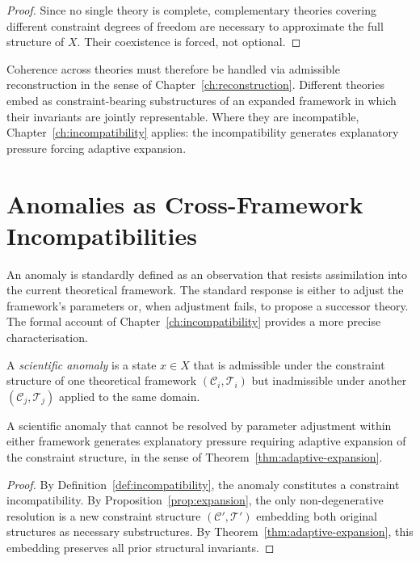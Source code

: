 \documentclass[11pt,openany]{book}
\begin{document}
\begin{proof}
Since no single theory is complete, complementary theories
covering different constraint degrees of freedom are
necessary to approximate the full structure of $X$.
Their coexistence is forced, not optional.
\end{proof}

Coherence across theories must therefore be handled via
admissible reconstruction in the sense of
Chapter~\ref{ch:reconstruction}.  Different theories embed
as constraint-bearing substructures of an expanded
framework in which their invariants are jointly
representable.  Where they are incompatible,
Chapter~\ref{ch:incompatibility} applies: the
incompatibility generates explanatory pressure forcing
adaptive expansion.

\section{Anomalies as Cross-Framework Incompatibilities}
\label{sec:anomalies}

An anomaly is standardly defined as an observation that
resists assimilation into the current theoretical
framework.  The standard response is either to adjust the
framework's parameters or, when adjustment fails, to
propose a successor theory.  The formal account of
Chapter~\ref{ch:incompatibility} provides a more precise
characterisation.

\begin{definition}
\label{def:anomaly}
A \emph{scientific anomaly} is a state $x \in X$ that is
admissible under the constraint structure of one
theoretical framework $(\mathcal{C}_i, \mathcal{T}_i)$
but inadmissible under another $(\mathcal{C}_j,
\mathcal{T}_j)$ applied to the same domain.
\end{definition}

\begin{proposition}
\label{prop:anomaly-pressure}
A scientific anomaly that cannot be resolved by parameter
adjustment within either framework generates explanatory
pressure requiring adaptive expansion of the constraint
structure, in the sense of
Theorem~\ref{thm:adaptive-expansion}.
\end{proposition}

\begin{proof}
By Definition~\ref{def:incompatibility}, the anomaly
constitutes a constraint incompatibility.  By
Proposition~\ref{prop:expansion}, the only non-degenerative
resolution is a new constraint structure $(\mathcal{C}',
\mathcal{T}')$ embedding both original structures as
necessary substructures.  By
Theorem~\ref{thm:adaptive-expansion}, this embedding
preserves all prior structural invariants.
\end{proof}
\end{document}

